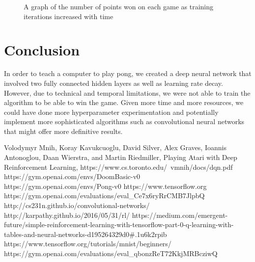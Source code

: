 \documentclass[12pt]{article}
\theoremstyle{plain}
\theoremstyle{definition}
\theoremstyle{remark}
\theoremstyle{plain}
\begin{document}
\begin{figure}
\begin{center}
\end{center}
\caption{A graph of the number of points won on each game as training iterations increased with time}
\label{proportion}
\end{figure}
\section{Conclusion}
In order to teach a computer to play pong, we created a deep neural network that involved two fully connected hidden layers as well as learning rate decay.  However, due to technical and temporal limitations, we were not able to train the algorithm to be able to win the game.  Given more time and more resources, we could have done more hyperparameter experimentation and potentially implement more sophisticated algorithms such as convolutional neural networks that might offer more definitive results.

\begin{thebibliography}{9}
 Volodymyr Mnih, Koray Kavukcuoglu, David Silver, Alex Graves, Ioannis Antonoglou,
Daan Wierstra, and Martin Riedmiller, Playing Atari with Deep Reinforcement Learning, https://www.cs.toronto.edu/~vmnih/docs/dqn.pdf 
 
 https://gym.openai.com/envs/DoomBasic-v0
 https://gym.openai.com/envs/Pong-v0
 https://www.tensorflow.org
 https://gym.openai.com/evaluations/eval\_Ce7x6ryRrCMB7JlpbQ 
 http://cs231n.github.io/convolutional-networks/
 http://karpathy.github.io/2016/05/31/rl/
 https://medium.com/emergent-future/simple-reinforcement-learning-with-tensorflow-part-0-q-learning-with-tables-and-neural-networks-d195264329d0\#.1u6k2rpib
 https://www.tensorflow.org/tutorials/mnist/beginners/
 https://gym.openai.com/evaluations/eval\_qbonzReT72KkjMRBcziwQ
\end{thebibliography}
\end{document}
